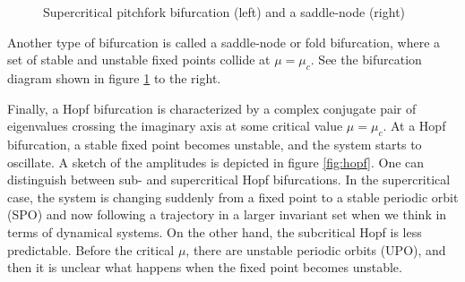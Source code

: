 \begin{figure}[ht]
\centering
\begin{subfigure}[t]{0.3\textwidth}
  \centering
\end{subfigure}
\hspace{0.1\textwidth}
\begin{subfigure}[t]{0.3\textwidth}
  \centering
\end{subfigure}
\caption{Supercritical pitchfork bifurcation (left) and a saddle-node (right)}
  \label{fig:pitch_saddle}
\end{figure}

Another type of bifurcation is called a saddle-node or fold bifurcation, where
a set of stable and unstable fixed points collide at $\mu = \mu_c$. See the
bifurcation diagram shown in figure \ref{fig:pitch_saddle} to the right.

Finally, a Hopf bifurcation is characterized by a complex conjugate pair of
eigenvalues crossing the imaginary axis at some critical value $\mu = \mu_c$.
At a Hopf bifurcation, a stable fixed point becomes unstable, and the system
starts to oscillate. A sketch of the amplitudes is depicted in figure
\ref{fig:hopf}. One can distinguish between sub- and supercritical Hopf
bifurcations. In the supercritical case, the system is changing suddenly from a
fixed point to a stable periodic orbit (SPO) and now following a trajectory in
a larger invariant set when we think in terms of dynamical systems. On the
other hand, the subcritical Hopf is less predictable. Before the critical
$\mu$, there are unstable periodic orbits (UPO), and then it is unclear what
happens when the fixed point becomes unstable.

